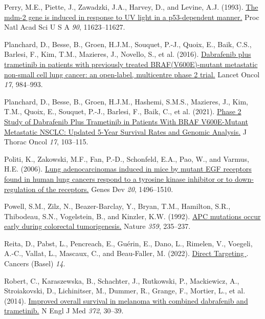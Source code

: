 \begin{CSLReferences}{0}{0}
\leavevmode{}%
Perry, M.E., Piette, J., Zawadzki, J.A., Harvey, D., and Levine, A.J. (1993). \href{https://doi.org/10.1073/pnas.90.24.11623}{The mdm-2 gene is induced in response to UV light in a p53-dependent manner.} Proc Natl Acad Sci U S A \emph{90}, 11623--11627.

\leavevmode{}%
Planchard, D., Besse, B., Groen, H.J.M., Souquet, P.-J., Quoix, E., Baik, C.S., Barlesi, F., Kim, T.M., Mazieres, J., Novello, S., et al. (2016). \href{https://doi.org/10.1016/s1470-2045(16)30146-2}{Dabrafenib plus trametinib in patients with previously treated BRAF(V600E)-mutant metastatic non-small cell lung cancer: an open-label, multicentre phase 2 trial.} Lancet Oncol \emph{17}, 984--993.

\leavevmode{}%
Planchard, D., Besse, B., Groen, H.J.M., Hashemi, S.M.S., Mazieres, J., Kim, T.M., Quoix, E., Souquet, P.-J., Barlesi, F., Baik, C., et al. (2021). \href{https://doi.org/10.1016/j.jtho.2021.08.011}{Phase 2 Study of Dabrafenib Plus Trametinib in Patients With BRAF V600E-Mutant Metastatic NSCLC: Updated 5-Year Survival Rates and Genomic Analysis.} J Thorac Oncol \emph{17}, 103--115.

\leavevmode{}%
Politi, K., Zakowski, M.F., Fan, P.-D., Schonfeld, E.A., Pao, W., and Varmus, H.E. (2006). \href{https://doi.org/10.1101/gad.1417406}{Lung adenocarcinomas induced in mice by mutant EGF receptors found in human lung cancers respond to a tyrosine kinase inhibitor or to down-regulation of the receptors.} Genes Dev \emph{20}, 1496--1510.

\leavevmode{}%
Powell, S.M., Zilz, N., Beazer-Barclay, Y., Bryan, T.M., Hamilton, S.R., Thibodeau, S.N., Vogelstein, B., and Kinzler, K.W. (1992). \href{https://doi.org/10.1038/359235a0}{APC mutations occur early during colorectal tumorigenesis.} Nature \emph{359}, 235--237.

\leavevmode{}%
Reita, D., Pabst, L., Pencreach, E., Guérin, E., Dano, L., Rimelen, V., Voegeli, A.-C., Vallat, L., Mascaux, C., and Beau-Faller, M. (2022). \href{https://doi.org/10.3390/cancers14051321}{Direct Targeting }. Cancers (Basel) \emph{14}.

\leavevmode{}%
Robert, C., Karaszewska, B., Schachter, J., Rutkowski, P., Mackiewicz, A., Stroiakovski, D., Lichinitser, M., Dummer, R., Grange, F., Mortier, L., et al. (2014). \href{https://doi.org/10.1056/nejmoa1412690}{Improved overall survival in melanoma with combined dabrafenib and trametinib.} N Engl J Med \emph{372}, 30--39.


\end{CSLReferences}
